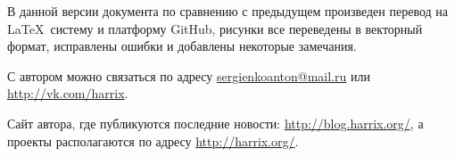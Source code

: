 В данной версии документа по сравнению с предыдущем произведен перевод на \LaTeX\ систему и платформу GitHub, рисунки все переведены в векторный формат, исправлены ошибки и добавлены некоторые замечания.

С автором можно связаться по адресу \href{mailto:sergienkoanton@mail.ru}{sergienkoanton@mail.ru} или  \href{http://vk.com/harrix}{http://vk.com/harrix}.

Сайт автора, где публикуются последние новости: \href{http://blog.harrix.org/}{http://blog.harrix.org/}, а проекты располагаются по адресу \href{http://harrix.org/}{http://harrix.org/}.


\clearpage